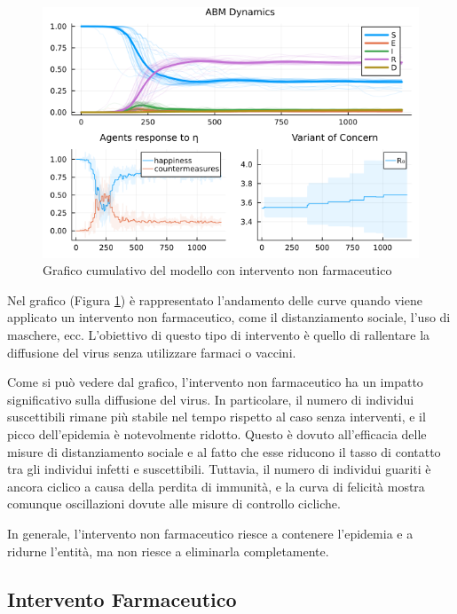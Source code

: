 \begin{figure}[H]
    \begin{center}
		\includegraphics[width=\textwidth]{img/SocialNetworkABM_CONTROL.png}
		\caption{Grafico cumulativo del modello con intervento non farmaceutico}
		\label{fig:abm_nonpharm_intervent}
	\end{center}
\end{figure}

Nel grafico (Figura \ref{fig:abm_nonpharm_intervent}) è 
rappresentato l'andamento delle curve quando viene applicato un 
intervento non farmaceutico, come il distanziamento sociale, 
l'uso di maschere, ecc. L'obiettivo di questo tipo di intervento 
è quello di rallentare la diffusione del virus senza utilizzare 
farmaci o vaccini.

Come si può vedere dal grafico, l'intervento non farmaceutico 
ha un impatto significativo sulla diffusione del virus. 
In particolare, il numero di individui suscettibili rimane 
più stabile nel tempo rispetto al caso senza interventi, e il 
picco dell'epidemia è notevolmente ridotto. Questo è dovuto 
all'efficacia delle misure di distanziamento sociale e al fatto 
che esse riducono il tasso di contatto tra gli individui infetti 
e suscettibili. Tuttavia, il numero di individui guariti è ancora 
ciclico a causa della perdita di immunità, e la curva di felicità 
mostra comunque oscillazioni dovute alle misure di controllo cicliche.

In generale, l'intervento non farmaceutico riesce a contenere 
l'epidemia e a ridurne l'entità, ma non riesce a eliminarla 
completamente.

\subsection{Intervento Farmaceutico}

